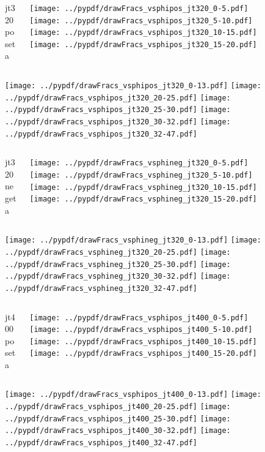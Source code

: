 \documentclass[aspectratio=169]{beamer}
\begin{document}
\begin{figure}[p]
\flushleft
\begin{columns}[T]
\begin{column}{.2\linewidth}
\centering
jt320 poseta
\end{column}
\begin{column}{.8\linewidth}
\texttt{[image: ../pypdf/drawFracs\_vsphipos\_jt320\_0-5.pdf]}
\texttt{[image: ../pypdf/drawFracs\_vsphipos\_jt320\_5-10.pdf]}
\texttt{[image: ../pypdf/drawFracs\_vsphipos\_jt320\_10-15.pdf]}
\texttt{[image: ../pypdf/drawFracs\_vsphipos\_jt320\_15-20.pdf]}
\end{column}
\end{columns}
\texttt{[image: ../pypdf/drawFracs\_vsphipos\_jt320\_0-13.pdf]}
\texttt{[image: ../pypdf/drawFracs\_vsphipos\_jt320\_20-25.pdf]}
\texttt{[image: ../pypdf/drawFracs\_vsphipos\_jt320\_25-30.pdf]}
\texttt{[image: ../pypdf/drawFracs\_vsphipos\_jt320\_30-32.pdf]}
\texttt{[image: ../pypdf/drawFracs\_vsphipos\_jt320\_32-47.pdf]}
\end{figure}

\begin{figure}[p]
\flushleft
\begin{columns}[T]
\begin{column}{.2\linewidth}
\centering
jt320 negeta
\end{column}
\begin{column}{.8\linewidth}
\texttt{[image: ../pypdf/drawFracs\_vsphineg\_jt320\_0-5.pdf]}
\texttt{[image: ../pypdf/drawFracs\_vsphineg\_jt320\_5-10.pdf]}
\texttt{[image: ../pypdf/drawFracs\_vsphineg\_jt320\_10-15.pdf]}
\texttt{[image: ../pypdf/drawFracs\_vsphineg\_jt320\_15-20.pdf]}
\end{column}
\end{columns}
\texttt{[image: ../pypdf/drawFracs\_vsphineg\_jt320\_0-13.pdf]}
\texttt{[image: ../pypdf/drawFracs\_vsphineg\_jt320\_20-25.pdf]}
\texttt{[image: ../pypdf/drawFracs\_vsphineg\_jt320\_25-30.pdf]}
\texttt{[image: ../pypdf/drawFracs\_vsphineg\_jt320\_30-32.pdf]}
\texttt{[image: ../pypdf/drawFracs\_vsphineg\_jt320\_32-47.pdf]}
\end{figure}

\begin{figure}[p]
\flushleft
\begin{columns}[T]
\begin{column}{.2\linewidth}
\centering
jt400 poseta
\end{column}
\begin{column}{.8\linewidth}
\texttt{[image: ../pypdf/drawFracs\_vsphipos\_jt400\_0-5.pdf]}
\texttt{[image: ../pypdf/drawFracs\_vsphipos\_jt400\_5-10.pdf]}
\texttt{[image: ../pypdf/drawFracs\_vsphipos\_jt400\_10-15.pdf]}
\texttt{[image: ../pypdf/drawFracs\_vsphipos\_jt400\_15-20.pdf]}
\end{column}
\end{columns}
\texttt{[image: ../pypdf/drawFracs\_vsphipos\_jt400\_0-13.pdf]}
\texttt{[image: ../pypdf/drawFracs\_vsphipos\_jt400\_20-25.pdf]}
\texttt{[image: ../pypdf/drawFracs\_vsphipos\_jt400\_25-30.pdf]}
\texttt{[image: ../pypdf/drawFracs\_vsphipos\_jt400\_30-32.pdf]}
\texttt{[image: ../pypdf/drawFracs\_vsphipos\_jt400\_32-47.pdf]}
\end{figure}
\end{document}
